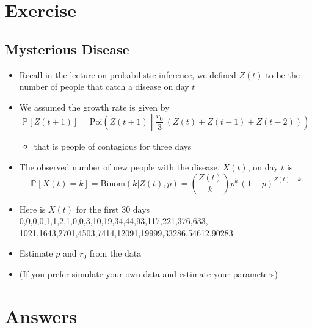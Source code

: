 \documentclass[11pt]{article}
\newcommand{\Prob}[2][]{\mathbb{P}_{#1\!}\left[ #2 \right]}
\begin{document}
\section{Exercise}
\label{sec:org1cbaec1}

\subsection{Mysterious Disease}
\label{sec:orgff86ae7}
\begin{itemize}
\item Recall in the lecture on probabilistic inference, we defined \(Z(t)\)
to be the number of people that catch a disease on day \(t\)
\item We assumed the growth rate is given by
$$ \Prob{Z(t+1)} = \mathrm{Poi}\!\left(Z(t+1)\middle|
     \frac{r_0}{3}\, (Z(t)+Z(t-1)+Z(t-2)) \right) $$
\begin{itemize}
\item that is people of contagious for three days
\end{itemize}
\item The observed number of new people with the disease, \(X(t)\), on
day \(t\) is 
$$ \Prob{X(t) = k} = \mathrm{Binom}(k|Z(t), p) = \binom{Z(t)}{k}
     p^k\,(1-p)^{Z(t)-k} $$
\item Here is \(X(t)\) for the first 30 days\\
0,0,0,0,1,1,2,1,0,0,3,10,19,34,44,93,117,221,376,633,\\
1021,1643,2701,4503,7414,12091,19999,33286,54612,90283\\
\item Estimate \(p\) and \(r_{0}\) from the data
\item (If you prefer simulate your own data and estimate your parameters)
\end{itemize}

\section{Answers}
\label{sec:orgac441f8}
\end{document}
